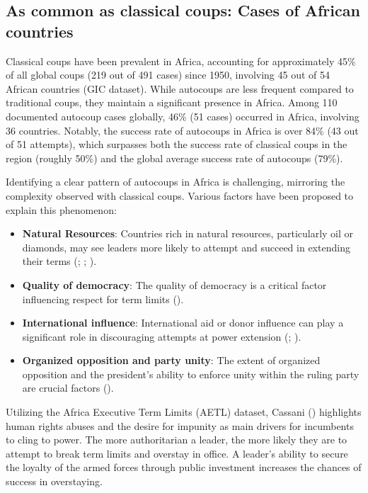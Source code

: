 \documentclass[
  12pt,
]{report}
\begin{document}
\subsection{As common as classical coups: Cases of African
countries}\label{as-common-as-classical-coups-cases-of-african-countries}

Classical coups have been prevalent in Africa, accounting for
approximately 45\% of all global coups (219 out of 491 cases) since
1950, involving 45 out of 54 African countries (GIC dataset). While
autocoups are less frequent compared to traditional coups, they maintain
a significant presence in Africa. Among 110 documented autocoup cases
globally, 46\% (51 cases) occurred in Africa, involving 36 countries.
Notably, the success rate of autocoups in Africa is over 84\% (43 out of
51 attempts), which surpasses both the success rate of classical coups
in the region (roughly 50\%) and the global average success rate of
autocoups (79\%).

Identifying a clear pattern of autocoups in Africa is challenging,
mirroring the complexity observed with classical coups. Various factors
have been proposed to explain this phenomenon:

\begin{itemize}
\item
  \textbf{Natural Resources}: Countries rich in natural resources,
  particularly oil or diamonds, may see leaders more likely to attempt
  and succeed in extending their terms (; ;
  ).
\item
  \textbf{Quality of democracy}: The quality of democracy is a critical
  factor influencing respect for term limits
  ().
\item
  \textbf{International influence}: International aid or donor influence
  can play a significant role in discouraging attempts at power
  extension (;
  ).
\item
  \textbf{Organized opposition and party unity}: The extent of organized
  opposition and the president's ability to enforce unity within the
  ruling party are crucial factors
  ().
\end{itemize}

Utilizing the Africa Executive Term Limits (AETL) dataset, Cassani
() highlights human rights abuses and
the desire for impunity as main drivers for incumbents to cling to
power. The more authoritarian a leader, the more likely they are to
attempt to break term limits and overstay in office. A leader's ability
to secure the loyalty of the armed forces through public investment
increases the chances of success in overstaying.
\end{document}

